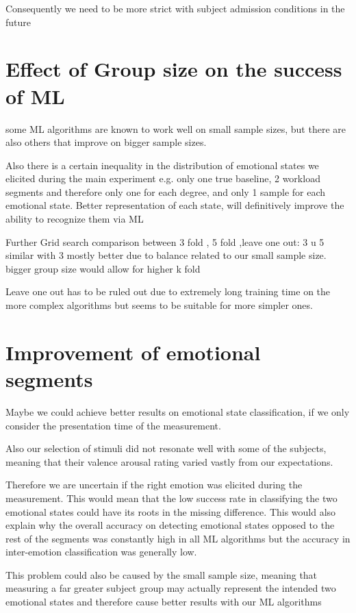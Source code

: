 Consequently we need to be more strict with subject admission conditions in the future

\section{Effect of Group size on the success of ML}
some ML algorithms are known to work well on small sample sizes, but there are also others that improve on bigger sample sizes.

Also there is a certain inequality in the distribution of emotional states we elicited during the main experiment e.g. only one true baseline, 2 workload segments and therefore only one for each degree, and only 1 sample for each emotional state. Better representation of each state, will definitively improve the ability to recognize them via ML  

Further Grid search comparison between 3 fold , 5 fold ,leave one out:
3 u 5 similar with 3 mostly better due to balance related to our small sample size. bigger group size would allow for higher k fold

Leave one out has to be ruled out due to extremely long training time on the more complex algorithms but seems to be suitable for more simpler ones.

\section{Improvement of emotional segments}
Maybe we could achieve better results on emotional state classification, if we only consider the presentation time of the measurement.

Also our selection of stimuli did not resonate well with some of the subjects, meaning that their valence arousal rating  varied vastly from our expectations.

Therefore  we are uncertain if the right emotion was elicited during the measurement. This would mean that the low success rate in classifying the two emotional states could have its roots in the missing difference. This would also explain why the overall accuracy on detecting emotional states opposed to the rest of the segments was constantly high in all ML algorithms but the accuracy in inter-emotion classification was generally low.

This problem could also be caused by the small sample size, meaning that measuring a far greater subject group may actually represent the intended two emotional states and therefore cause better results with our ML algorithms


